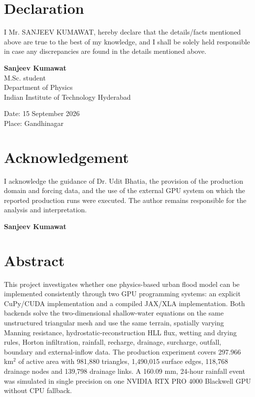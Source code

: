 \documentclass[11pt,a4paper,oneside]{report}
\begin{document}
\chapter*{Declaration}
\thispagestyle{empty}
I Mr. SANJEEV KUMAWAT, hereby declare that the details/facts mentioned above are true to the best of my knowledge, and I shall be solely held responsible in case any discrepancies are found in the details mentioned above.

\vspace{12mm}
\begin{flushright}
\textbf{Sanjeev Kumawat}\\[1mm]
M.Sc. student\\
Department of Physics\\
Indian Institute of Technology Hyderabad
\end{flushright}

\vspace{18mm}
\noindent Date: 15 September 2026\\
Place: Gandhinagar
\clearpage

\chapter*{Acknowledgement}
\thispagestyle{empty}
I acknowledge the guidance of Dr. Udit Bhatia, the provision of the production domain and
forcing data, and the use of the external GPU system on which the reported production runs
were executed. The author remains responsible for the analysis and interpretation.

\vspace{12mm}
\begin{flushright}
\textbf{Sanjeev Kumawat}
\end{flushright}
\clearpage

\chapter*{Abstract}
This project investigates whether one physics-based urban flood model can be implemented
consistently through two GPU programming systems: an explicit CuPy/CUDA implementation and
a compiled JAX/XLA implementation. Both backends solve the two-dimensional shallow-water
equations on the same unstructured triangular mesh and use the same terrain, spatially varying
Manning resistance, hydrostatic-reconstruction HLL flux, wetting and drying rules, Horton
infiltration, rainfall, recharge, drainage, surcharge, outfall, boundary and external-inflow
data. The production experiment covers 297.966 km$^2$ of active area with 981,880 triangles,
1,490,015 surface edges, 118,768 drainage nodes and 139,798 drainage links. A 160.09 mm,
24-hour rainfall event was simulated in single precision on one NVIDIA RTX PRO 4000 Blackwell
GPU without CPU fallback.
\end{document}
